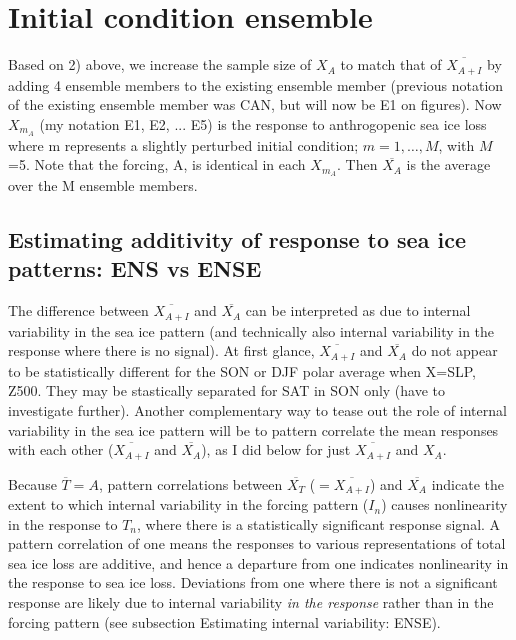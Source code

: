 \documentclass[12pt]{article}
\begin{document}
\section{Initial condition ensemble}
Based on 2) above, we increase the sample size of ${X_{A}}$ to match that of $\overline{X_{A+I}}$ by adding 4 ensemble members to the existing ensemble member (previous notation of the existing ensemble member was CAN, but will now be E1 on figures). Now $X_{m_A}$ (my notation E1, E2, ... E5) is the response to anthrogopenic sea ice loss where m represents a slightly perturbed initial condition; $m=1,\ldots,M$, with $M$=5. Note that the forcing, A, is identical in each $X_{m_A}$. Then $\overline{X_{A}}$ is the average over the M ensemble members.

\subsection{Estimating additivity of response to sea ice patterns: ENS vs ENSE}

The difference between $\overline{X_{A+I}}$ and $\overline{X_{A}}$ can be interpreted as due to internal variability in the sea ice pattern (and technically also internal variability in the response where there is no signal). At first glance, $\overline{X_{A+I}}$ and $\overline{X_{A}}$ do not appear to be statistically different for the SON or DJF polar average when X=SLP, Z500. They may be stastically separated for SAT in SON only (have to investigate further). Another complementary way to tease out the role of internal variability in the sea ice pattern will be to pattern correlate the mean responses with each other ($\overline{X_{A+I}}$ and $\overline{X_{A}}$), as I did below for just $\overline{X_{A+I}}$ and $X_A$.

Because $\overline{T} = A$, pattern correlations between $\overline{X_{T}}$ ($=\overline{X_{A+I}}$) and $\overline{X_{A}}$ indicate the extent to which internal variability in the forcing pattern ($I_n$) causes nonlinearity in the response to $T_n$, where there is a statistically significant response signal. A pattern correlation of one means the responses to various representations of total sea ice loss are additive, and hence a departure from one indicates nonlinearity in the response to sea ice loss. Deviations from one where there is not a significant response are likely due to internal variability \textit{in the response} rather than in the forcing pattern (see subsection Estimating internal variability: ENSE). 
\end{document}
